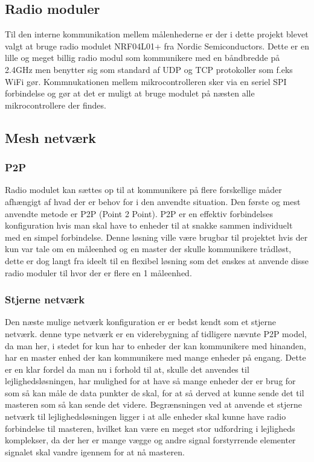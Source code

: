 \subsection{Radio moduler}
Til den interne kommunikation mellem målenhederne er der i dette projekt blevet valgt at bruge radio modulet NRF04L01+ fra Nordic Semiconductors.
\newline
Dette er en lille og meget billig radio modul som kommunikere med en båndbredde på 2.4GHz men benytter sig som standard af UDP og TCP protokoller som f.eks WiFi gør. 
Kommnukationen mellem mikrocontrolleren sker via en seriel SPI forbindelse og gør at det er muligt at bruge modulet på næsten alle mikrocontrollere der findes.

\subsection{Mesh netværk}
\subsubsection*{P2P}
Radio modulet kan sættes op til at kommunikere på flere forskellige måder afhængigt af hvad der er behov for i den anvendte situation.
Den første og mest anvendte metode er P2P (Point 2 Point).
\newline
P2P er en effektiv forbindelses konfiguration hvis man skal have to enheder til at snakke sammen individuelt med en simpel forbindelse. Denne løsning ville være brugbar til projektet hvis der kun var tale om en måleenhed og en master der skulle kommunikere trådløst, dette er dog langt fra ideelt til en flexibel løsning som det ønskes at anvende disse radio moduler til hvor der er flere en 1 måleenhed.

\subsubsection*{Stjerne netværk}
Den næste mulige netværk konfiguration er er bedst kendt som et stjerne netværk. denne type netværk er en viderebygning af tidligere nævnte P2P model, da man her, i stedet for kun har to enheder der kan kommunikere med hinanden, har en master enhed der kan kommunikere med mange enheder på engang. Dette er en klar fordel da man nu i forhold til at, skulle det anvendes til lejlighedsløsningen, har mulighed for at have så mange enheder der er brug for som så kan måle de data punkter de skal, for at så derved at kunne sende det til masteren som så kan sende det videre.
\newline
Begrænsningen ved at anvende et stjerne netværk til lejlighedsløsningen ligger i at alle enheder skal kunne have radio forbindelse til masteren, hvilket kan være en meget stor udfordring i lejligheds komplekser, da der her er mange vægge og andre signal forstyrrende elementer signalet skal vandre igennem for at nå masteren.

